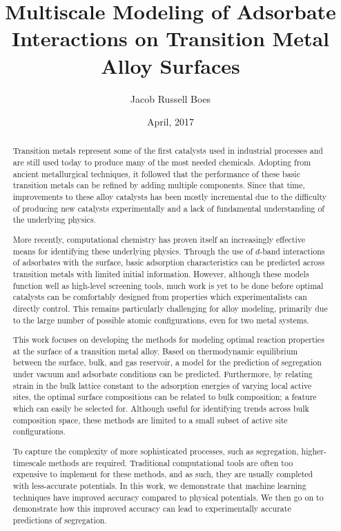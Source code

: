 \documentclass[12pt,oneside]{cmuthesis}
\author{Jacob Russell Boes}
\date{April, 2017}
\title{Multiscale Modeling of Adsorbate Interactions on Transition Metal Alloy Surfaces}
\begin{document}
\maketitle

\frontmatter
{}

\begin{abstract}
Transition metals represent some of the first catalysts used in industrial processes and are still used today to produce many of the most needed chemicals. Adopting from ancient metallurgical techniques, it followed that the performance of these basic transition metals can be refined by adding multiple components. Since that time, improvements to these alloy catalysts has been mostly incremental due to the difficulty of producing new catalysts experimentally and a lack of fundamental understanding of the underlying physics.

More recently, computational chemistry has proven itself an increasingly effective means for identifying these underlying physics. Through the use of $d$-band interactions of adsorbates with the surface, basic adsorption characteristics can be predicted across transition metals with limited initial information. However, although these models function well as high-level screening tools, much work is yet to be done before optimal catalysts can be comfortably designed from properties which experimentalists can directly control. This remains particularly challenging for alloy modeling, primarily due to the large number of possible atomic configurations, even for two metal systems.

This work focuses on developing the methods for modeling optimal reaction properties at the surface of a transition metal alloy. Based on thermodynamic equilibrium between the surface, bulk, and gas reservoir, a model for the prediction of segregation under vacuum and adsorbate conditions can be predicted. Furthermore, by relating strain in the bulk lattice constant to the adsorption energies of varying local active sites, the optimal surface compositions can be related to bulk composition; a feature which can easily be selected for. Although useful for identifying trends across bulk composition space, these methods are limited to a small subset of active site configurations.

To capture the complexity of more sophisticated processes, such as segregation, higher-timescale methods are required. Traditional computational tools are often too expensive to implement for these methods, and as such, they are usually completed with less-accurate potentials. In this work, we demonstrate that machine learning techniques have improved accuracy compared to physical potentials. We then go on to demonstrate how this improved accuracy can lead to experimentally accurate predictions of segregation.
\end{abstract}
\end{document}
